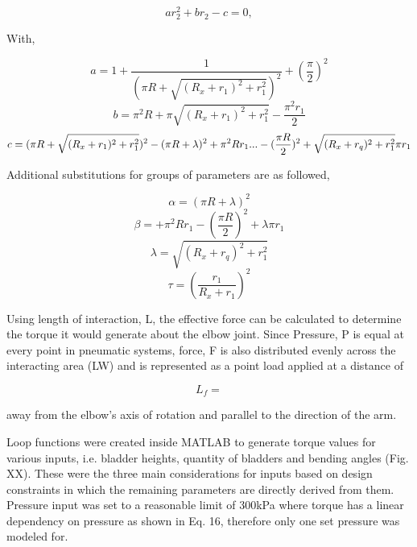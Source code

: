 \documentclass[letterpaper, 10 pt, conference]{ieeeconf}  %
\begin{document}
\begin{equation}\label{eq. X7}
	ar_2^2+br_2-c = 0,
\end{equation}

With,

\begin{equation}\label{eq. X8}
	a = 1+\frac{1}{(\pi R+\sqrt{(R_x+r_1)^2+r_1^2})^2}+(\frac{\pi}{2})^2
\end{equation}
\begin{equation}\label{eq. X9}
	b = \pi^2R+\pi\sqrt{(R_x+r_1)^2+r_1^2}-\frac{\pi^2r_1}{2}
\end{equation}
\begin{equation}\label{eq. X10}
	c = (\pi R+\sqrt{(R_x+r_1)^2+r_1^2})^2- (\pi R+\lambda)^2+\pi^2Rr_1...\\
    -(\frac{\pi R}{2})^2+\sqrt{(R_x+r_q)^2+r_1^2}\pi r_1
\end{equation}

Additional substitutions for groups of parameters are as followed,

\begin{equation}\label{eq. X11}
	\alpha = (\pi R+\lambda)^2
\end{equation}
\begin{equation}\label{eq. X12}
	\beta = +\pi^2Rr_1-(\frac{\pi R}{2})^2+\lambda\pi r_1
\end{equation}
\begin{equation}\label{eq. X13}
	\lambda = \sqrt{(R_x+r_q)^2+r_1^2}
\end{equation}
\begin{equation}\label{eq. X14}
	\tau = (\frac{r_1}{R_x+r_1})^2
\end{equation}

Using length of interaction, L, the effective force can be calculated to determine the torque it would generate about the elbow joint. Since Pressure, P is equal at every point in pneumatic systems, force, F is also distributed evenly across the interacting area (LW) and is represented as a point load applied at a distance of 

\begin{equation}
	L_f = 
\end{equation}

away from the elbow’s axis of rotation and parallel to the direction of the arm. 

Loop functions were created inside MATLAB to generate torque values for various inputs, i.e. bladder heights, quantity of bladders and bending angles (Fig. XX). These were the three main considerations for inputs based on design constraints in which the remaining parameters are directly derived from them. Pressure input was set to a reasonable limit of 300kPa where torque has a linear dependency on pressure as shown in Eq. 16, therefore only one set pressure was modeled for. 
\end{document}
